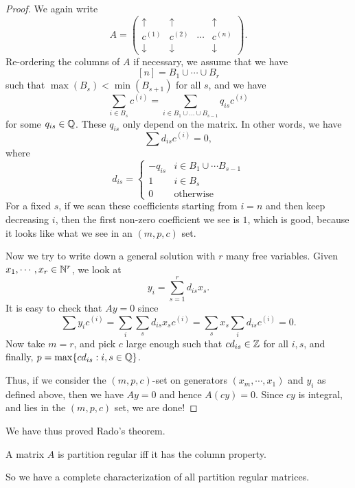 \documentclass[a4paper]{article}
\begin{document}
  \begin{proof}
    We again write
    \[
      A =
      \begin{pmatrix}
        \uparrow & \uparrow & & \uparrow\\
        c^{(1)} & c^{(2)} & \cdots & c^{(n)}\\
        \downarrow & \downarrow & & \downarrow
      \end{pmatrix}.
    \]
    Re-ordering the columns of $A$ if necessary, we assume that we have
    \[
      [n] = B_1 \cup \cdots \cup B_r
    \]
    such that $\max(B_s) < \min(B_{s + 1})$ for all $s$, and we have
    \[
      \sum_{i \in B_s} c^{(i)} = \sum_{i \in B_1 \cup \ldots \cup B_{s - 1}} q_{is}c^{(i)}
    \]
    for some $q_{is} \in \mathbb{Q}$. These $q_{is}$ only depend on the matrix. In other words, we have
    \[
      \sum d_{is} c^{(i)} = 0,
    \]
    where
    \[
      d_{is} =
      \begin{cases}
        -q_{is} & i \in B_1 \cup \cdots B_{s - 1}\\
        1 & i \in B_s\\
        0 & \text{otherwise}
      \end{cases}
    \]
    For a fixed $s$, if we scan these coefficients starting from $i = n$ and then keep decreasing $i$, then the first non-zero coefficient we see is $1$, which is good, because it looks like what we see in an $(m, p, c)$ set.

    Now we try to write down a general solution with $r$ many free variables. Given $x_1, \cdots, x_r \in \mathbb{N}^r$, we look at
    \[
      y_i = \sum_{s = 1}^r d_{is}x_s.
    \]
    It is easy to check that $Ay = 0$ since
    \[
      \sum y_i c^{(i)} = \sum_i \sum_s d_{is} x_s c^{(i)} = \sum_s x_s \sum_i d_{is} c^{(i)} = 0.
    \]
    Now take $m = r$, and pick $c$ large enough such that $c d_{is} \in \mathbb{Z}$ for all $i, s$, and finally, $p = \max \{c d_{is}: i, s \in \mathbb{Q}\}$.

    Thus, if we consider the $(m, p, c)$-set on generators $(x_m, \cdots, x_1)$ and $y_i$ as defined above, then we have $Ay = 0$ and hence $A(cy) = 0$. Since $cy$ is integral, and lies in the $(m, p, c)$ set, we are done!
  \end{proof}

  We have thus proved Rado's theorem.
  \begin{thm}
    A matrix $A$ is partition regular iff it has the column property.
  \end{thm}
  So we have a complete characterization of all partition regular matrices.
\end{document}
